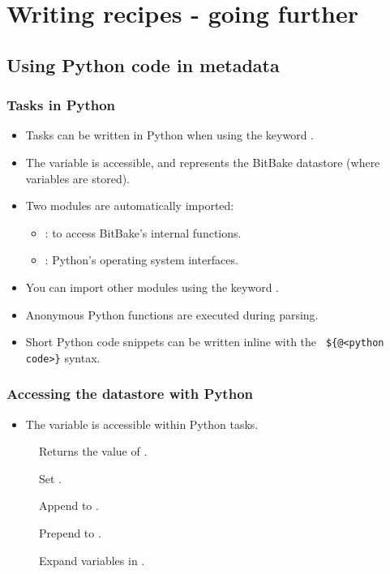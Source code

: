 \section{Writing recipes - going further}

\subsection{Using Python code in metadata}

\begin{frame}
  \frametitle{Tasks in Python}
  \begin{itemize}
    \item Tasks can be written in Python when using the keyword
      .
    \item The  variable is accessible, and represents the
      BitBake datastore (where variables are stored).
    \item Two modules are automatically imported:
      \begin{itemize}
        \item {}: to access BitBake's internal functions.
        \item {}: Python's operating system interfaces.
      \end{itemize}
    \item You can import other modules using the keyword
      .
    \item Anonymous Python functions are executed during parsing.
      \item Short Python code snippets can be written inline with the {\tt
        \$\{@<python code>\}} syntax.
  \end{itemize}
\end{frame}

\begin{frame}
  \frametitle{Accessing the datastore with Python}
  \begin{itemize}
    \item The  variable is accessible within Python tasks.
  \end{itemize}
  \begin{description}
    \item[] Returns the value of
      .
    \item[] Set .
    \item[] Append  to
      .
    \item[] Prepend  to
      .
    \item[] Expand variables in
      .
  \end{description}
\end{frame}

